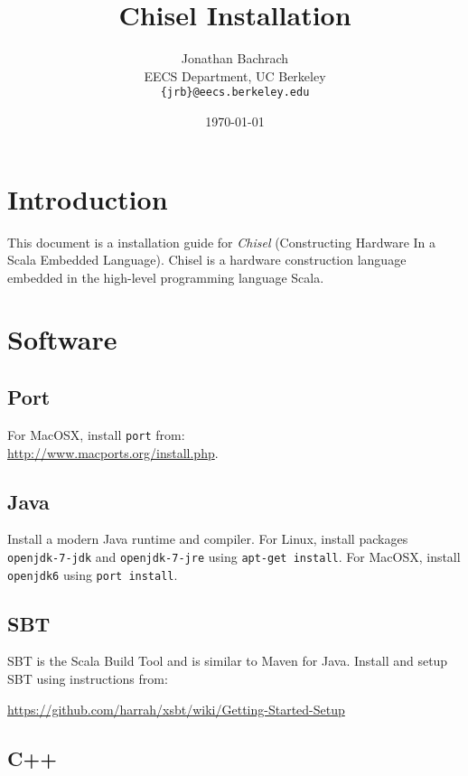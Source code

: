 \documentclass[twocolumn, 10pt]{article}
\title{Chisel Installation}
\author{Jonathan Bachrach \\
EECS Department, UC Berkeley\\
{\tt  \{jrb\}@eecs.berkeley.edu}
}
\date{\today}
\begin{document}
\maketitle{}

\section{Introduction}

This document is a installation guide for {\em Chisel} (Constructing
Hardware In a Scala Embedded Language).  Chisel is a hardware
construction language embedded in the high-level programming language
Scala.  

\section{Software}

\subsection{Port}

For MacOSX, install \verb+port+ from:\\

\url{http://www.macports.org/install.php}.

\subsection{Java}

Install a modern Java runtime and compiler.
For Linux, install packages \verb+openjdk-7-jdk+ and
\verb+openjdk-7-jre+ using \verb+apt-get install+.
For MacOSX, install \verb+openjdk6+ using \verb+port install+.

\subsection{SBT}

SBT is the Scala Build Tool and is similar to Maven for Java.  Install
and setup SBT using instructions from: \\

\begin{scriptsize}
\url{https://github.com/harrah/xsbt/wiki/Getting-Started-Setup}
\end{scriptsize}

\subsection{C++}
\end{document}
